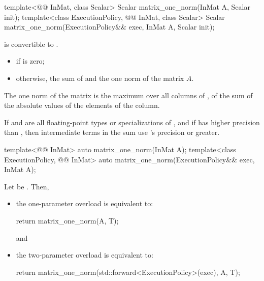 %
\begin{itemdecl}
template<@@ InMat, class Scalar>
  Scalar matrix_one_norm(InMat A, Scalar init);
template<class ExecutionPolicy, @@ InMat, class Scalar>
  Scalar matrix_one_norm(ExecutionPolicy&& exec, InMat A, Scalar init);
\end{itemdecl}

\begin{itemdescr}
\pnum
\mandates
{}
is convertible to .

\pnum
\returns
\begin{itemize}
\item
{} if  is zero;
\item
otherwise, the sum of  and the one norm of the matrix $A$.
\end{itemize}
\begin{note}
The one norm of the matrix 
is the maximum over all columns of ,
of the sum of the absolute values of the elements of the column.
\end{note}

\pnum
\remarks
If  and 
are all floating-point types or specializations of ,
and if  has higher precision
than ,
then intermediate terms in the sum use 's precision or greater.
\end{itemdescr}

%
\begin{itemdecl}
template<@@ InMat>
  auto matrix_one_norm(InMat A);
template<class ExecutionPolicy, @@ InMat>
  auto matrix_one_norm(ExecutionPolicy&& exec, InMat A);
\end{itemdecl}

\begin{itemdescr}
\pnum
\effects
Let  be
.
Then,
\begin{itemize}
\item
the one-parameter overload is equivalent to:
\begin{codeblock}
return matrix_one_norm(A, T{});
\end{codeblock}
and
\item
the two-parameter overload is equivalent to:
\begin{codeblock}
return matrix_one_norm(std::forward<ExecutionPolicy>(exec), A, T{});
\end{codeblock}
\end{itemize}
\end{itemdescr}

